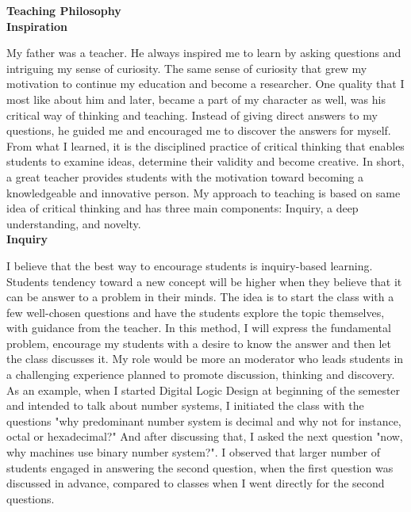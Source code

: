 {\bf Teaching Philosophy}
\vspace*{3\baselineskip}\\
{\bf Inspiration}

My father was a teacher. He always inspired me to learn by asking questions and intriguing my sense of curiosity. The same sense of curiosity  that grew my motivation to continue  my education and become a researcher. One quality that I most like about him and later, became a part of my character as well, was his critical way of thinking and teaching.  Instead of giving direct answers to my questions, he guided me and encouraged me to discover the answers for myself.
 From what I learned, it is the disciplined practice of critical thinking that
enables  students to examine ideas, determine their validity and become creative.  
In short,  a great teacher provides students with the motivation toward becoming a knowledgeable and innovative person.
My approach to teaching
 is based on same idea of critical thinking and has three main components: Inquiry,  a deep understanding, and novelty.
 \\ [0.2cm]
{\bf Inquiry }

I believe that the best way  to encourage students is inquiry-based learning. 
Students tendency toward a new concept will be higher when they believe that it can be answer to a problem in their minds.  
The idea is to start the class with a few well-chosen questions and have the students explore the topic themselves, with guidance from the teacher. 
In this method, I will express the fundamental problem,
 encourage my students with a desire to know the answer and then  let the class  discusses it. 
 My role would be more an moderator who leads students in a challenging experience  planned to promote discussion, thinking and discovery. As an example,  when I started Digital Logic Design at  beginning of the semester and intended to talk about number systems,  I initiated the class with the questions  "why predominant number system is decimal and why not for instance, octal or hexadecimal?"
 And after discussing that, I asked the next question "now, why machines use binary number system?".  I observed that larger number of students engaged in answering the second question, when the first question was discussed in advance, compared to classes when I went directly for the second questions. 


